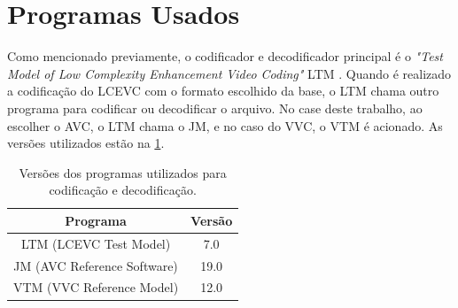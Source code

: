 \section{Programas Usados}

Como mencionado previamente, o codificador e decodificador principal é o \textit{"Test Model of Low 
Complexity Enhancement Video Coding"} LTM \cite{ltm_git}. Quando é realizado a codificação do LCEVC com o formato
escolhido da base, o LTM chama outro programa para codificar ou decodificar o arquivo. No case deste
trabalho, ao escolher o \acrshort{AVC}, o LTM chama o JM, e no caso do \acrshort{VVC}, o VTM é acionado.
As versões utilizados estão na \ref{tab:program_versions}.

\begin{table}[h]
    \centering
    \begin{tabular}{|c|c|}
        \hline
        \textbf{Programa} & \textbf{Versão} \\
        \hline
        LTM (LCEVC Test Model) & 7.0 \\
        JM (AVC Reference Software) & 19.0 \\
        VTM (VVC Reference Model) & 12.0 \\
        \hline
    \end{tabular}
    \caption{Versões dos programas utilizados para codificação e decodificação.}
    \label{tab:program_versions}
\end{table}